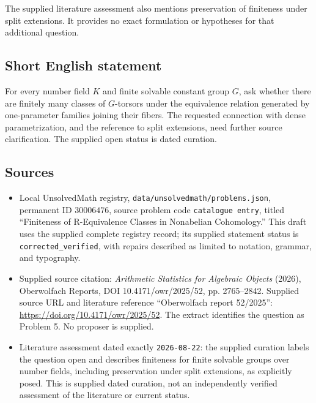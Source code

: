 \documentclass[11pt]{article}
\begin{document}
The supplied literature assessment also mentions preservation of finiteness under split extensions. It provides no exact formulation or hypotheses for that additional question.
\subsection{Short English statement}
For every number field \(K\) and finite solvable constant group \(G\), ask whether there are finitely many classes of \(G\)-torsors under the equivalence relation generated by one-parameter families joining their fibers. The requested connection with dense parametrization, and the reference to split extensions, need further source clarification. The supplied open status is dated curation.
\subsection{Sources}
\begin{itemize}
\item Local UnsolvedMath registry, \texttt{data/unsolvedmath/problems.json}, permanent ID \(30006476\), source problem code \texttt{catalogue entry}, titled ``Finiteness of R-Equivalence Classes in Nonabelian Cohomology.'' This draft uses the supplied complete registry record; its supplied statement status is \texttt{corrected\_verified}, with repairs described as limited to notation, grammar, and typography.
\item Supplied source citation: \emph{Arithmetic Statistics for Algebraic Objects} (2026), Oberwolfach Reports, DOI 10.4171/owr/2025/52, pp. 2765--2842. Supplied source URL and literature reference ``Oberwolfach report 52/2025'': \url{https://doi.org/10.4171/owr/2025/52}. The extract identifies the question as Problem 5. No proposer is supplied.
\item Literature assessment dated exactly \texttt{2026-08-22}: the supplied curation labels the question open and describes finiteness for finite solvable groups over number fields, including preservation under split extensions, as explicitly posed. This is supplied dated curation, not an independently verified assessment of the literature or current status.
\end{itemize}
\end{document}
